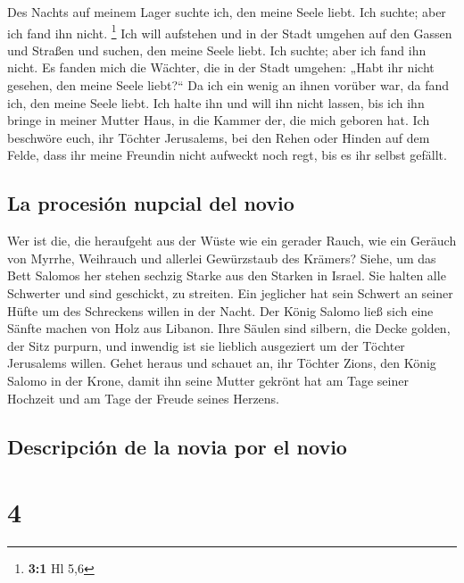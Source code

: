  Des Nachts auf meinem Lager suchte ich, den meine Seele
liebt. Ich suchte; aber ich fand ihn nicht. \footnote{\textbf{3:1} Hl
  5,6}  Ich will aufstehen und in der Stadt umgehen auf
den Gassen und Straßen und suchen, den meine Seele liebt. Ich suchte;
aber ich fand ihn nicht.  Es fanden mich die Wächter, die
in der Stadt umgehen: „Habt ihr nicht gesehen, den meine Seele
liebt?{}``  Da ich ein wenig an ihnen vorüber war, da fand
ich, den meine Seele liebt. Ich halte ihn und will ihn nicht lassen, bis
ich ihn bringe in meiner Mutter Haus, in die Kammer der, die mich
geboren hat.  Ich beschwöre euch, ihr Töchter Jerusalems,
bei den Rehen oder Hinden auf dem Felde, dass ihr meine Freundin nicht
aufweckt noch regt, bis es ihr selbst gefällt.

\hypertarget{la-procesiuxf3n-nupcial-del-novio}{%
\subsection{La procesión nupcial del
novio}\label{la-procesiuxf3n-nupcial-del-novio}}

 Wer ist die, die heraufgeht aus der Wüste wie ein gerader
Rauch, wie ein Geräuch von Myrrhe, Weihrauch und allerlei Gewürzstaub
des Krämers?  Siehe, um das Bett Salomos her stehen
sechzig Starke aus den Starken in Israel.  Sie halten alle
Schwerter und sind geschickt, zu streiten. Ein jeglicher hat sein
Schwert an seiner Hüfte um des Schreckens willen in der Nacht.
 Der König Salomo ließ sich eine Sänfte machen von Holz
aus Libanon.  Ihre Säulen sind silbern, die Decke golden,
der Sitz purpurn, und inwendig ist sie lieblich ausgeziert um der
Töchter Jerusalems willen.  Gehet heraus und schauet an,
ihr Töchter Zions, den König Salomo in der Krone, damit ihn seine Mutter
gekrönt hat am Tage seiner Hochzeit und am Tage der Freude seines
Herzens.

\hypertarget{descripciuxf3n-de-la-novia-por-el-novio}{%
\subsection{Descripción de la novia por el
novio}\label{descripciuxf3n-de-la-novia-por-el-novio}}

\hypertarget{section-3}{%
\section{4}\label{section-3}}

